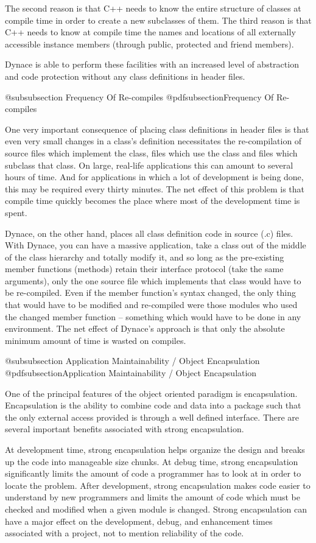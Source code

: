 The second reason is that C++ needs to know the entire structure of
classes at compile time in order to create a new subclasses of them.
The third reason is that C++ needs to know at compile time the names
and locations of all externally accessible instance members (through
public, protected and friend members).

Dynace is able to perform these facilities with an increased level
of abstraction and code protection without any class definitions
in header files.

@subsubsection Frequency Of Re-compiles
@pdfsubsection{Frequency Of Re-compiles}

One very important consequence of placing class definitions in header
files is that even very small changes in a class's definition
necessitates the re-compilation of source files which implement the
class, files which use the class and files which subclass that class.
On large, real-life applications this can amount to several hours
of time.  And for applications in which a lot of development is
being done, this may be required every thirty minutes.  The net
effect of this problem is that compile time quickly becomes the
place where most of the development time is spent.

Dynace, on the other hand, places all class definition code in
source (.c) files.  With Dynace, you can have a massive application,
take a class out of the middle of the class hierarchy and totally
modify it, and so long as the pre-existing member functions (methods)
retain their interface protocol (take the same arguments), only the
one source file which implements that class would have to be
re-compiled.  Even if the member function's syntax changed, the only
thing that would have to be modified and re-compiled were those
modules who used the changed member function -- something which would
have to be done in any environment.  The net effect of Dynace's
approach is that only the absolute minimum amount of time is wasted
on compiles.

@subsubsection Application Maintainability / Object Encapsulation
@pdfsubsection{Application Maintainability / Object Encapsulation}

One of the principal features of the object oriented paradigm is
encapsulation.  Encapsulation is the ability to combine code and data
into a package such that the only external access provided is through
a well defined interface.  There are several important benefits associated
with strong encapsulation.

At development time, strong encapsulation helps organize the design and
breaks up the code into manageable size chunks.  At debug time, strong
encapsulation significantly limits the amount of code a programmer
has to look at in order to locate the problem.  After development,
strong encapsulation makes code easier to understand by new programmers
and limits the amount of code which must be checked and modified when
a given module is changed.  Strong encapsulation can have a major
effect on the development, debug, and enhancement times associated
with a project, not to mention reliability of the code.

